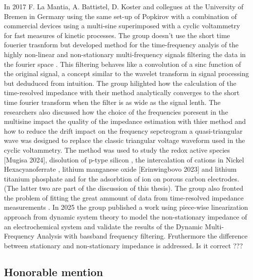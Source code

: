 \label{sec:dmfa}
In 2017 F. La Mantia, A. Battistel, D. Koster and collegues at the University of Bremen in Germany using the same set-up of Popkirov with a combination of commercial devices using a multi-sine superimposed with a cyclic voltammetry \cite{kosterDynamicImpedanceSpectroscopy2017} for fast measures of kinetic processes. The group doesn't use the short time fouerier trasnform but developed method for the time-frequency analyis of the highly non-linear and non-stationary multi-frequency signals filtering the data in the fourier space \cite{battistelPhysicalDefinitionDynamic2019}. This filtering behaves like a convolution of a sinc function of the original signal, a concept similar to the wavelet transform in signal processing but deduduced from intuition.
The group hilighted how the calculation of the time-resolved impedance with their method analytically converges to the short time fourier transform when the filter is as wide as the signal lenth. The researchers also discussed how the choice of the frequencies poresent in the multisine impact the quality of the impedance estimation with thier method and how to reduce the drift impact on the frequency sepctrogram a quasi-triangular wave was designed to replace the classic triangular voltage waveform used in the cyclic voltammetry. 
The method was used to study the redox active species \cite{kosterDynamicImpedanceSpectroscopy2017} [Mugisa 2024], disolution of p-type silicon \cite{kosterMeasurementAnalysisDynamic2018}, the intercalation of cations in Nickel Hexacyanoferrate \cite{erinmwingbovoDynamicImpedanceSpectroscopy2019}, lithium manganese oxide \cite{erinmwingbovoDynamicImpedanceSpectroscopy2020} [Erinwingbovo 2023] and lithium titanium phosphate \cite{scarpioniElectrochemicalImpedanceSpectroscopy2023a} and for the adsorbtion of ion on porous carbon electrodes. (The latter two are part of the discussion of this thesis).
The group also fronted the problem of fitting the great ammount of data from time-resolved impedance measurements \cite{battistelAnalysisNonstationaryImpedance2016} \cite{chukwuDynamicImpedanceSpectroscopy2023}. In 2025 the group published a work using piece-wise linearization approach from dynamic system theory to model the non-stationary impedance of an electrochemical system and validate the results of the Dynamic Multi-Frequency Analysis with bassband frequency filtering. Fruthermore the difference between stationary and non-stationary impedance is addressed. Is it correct ???

\subsection{Honorable mention}


